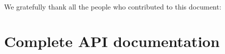 \documentclass[a4paper,11pt,twoside,openright]{memoir}
\begin{document}
We gratefully thank all the people who contributed to this document:















\chapter{Complete API documentation}
\label{chap:apidoc}





%
\end{document}
